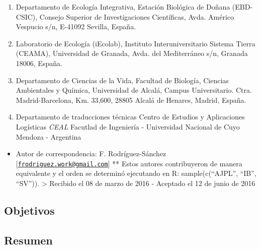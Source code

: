 \documentclass[]{tufte-handout}
\providecommand{\tightlist}{%
  \setlength{\itemsep}{0pt}\setlength{\parskip}{0pt}}
\begin{document}
\begin{enumerate}
\def\labelenumi{(\arabic{enumi})}
\tightlist
\item
  Departamento de Ecología Integrativa, Estación Biológica de Doñana
  (EBD-CSIC), Consejo Superior de Investigaciones Científicas, Avda.
  Américo Vespucio s/n, E-41092 Sevilla, España.
\item
  Laboratorio de Ecología (iEcolab), Instituto Interuniversitario
  Sistema Tierra (CEAMA), Universidad de Granada, Avda. del Mediterráneo
  s/n, Granada 18006, España.
\item
  Departamento de Ciencias de la Vida, Facultad de Biología, Ciencias
  Ambientales y Química, Universidad de Alcalá, Campus Universitario.
  Ctra. Madrid-Barcelona, Km. 33,600, 28805 Alcalá de Henares, Madrid,
  España.
\item
  Departamento de traducciones técnicas Centro de Estudios y
  Aplicaciones Logísticas \emph{CEAL} Facutlad de Ingeniería -
  Universidad Nacional de Cuyo Mendoza - Argentina
\end{enumerate}

\begin{itemize}
\tightlist
\item
  Autor de correspondencia: F. Rodríguez-Sánchez
  {[}\href{mailto:frodriguez.work@gmail.com}{\nolinkurl{frodriguez.work@gmail.com}}{]}
  ** Estos autores contribuyeron de manera equivalente y el orden se
  determinó ejecutando en R: sample(c(``AJPL'', ``IB'', ``SV'')).
  \textgreater{} Recibido el 08 de marzo de 2016 - Aceptado el 12 de
  junio de 2016
\end{itemize}

\hypertarget{objetivos}{%
\subsection{Objetivos}\label{objetivos}}

\hypertarget{resumen}{%
\subsection{Resumen}\label{resumen}}
\end{document}
